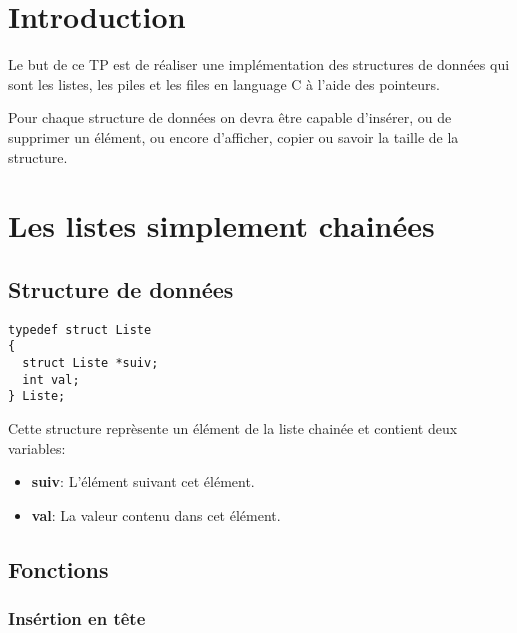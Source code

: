 \documentclass[a4paper]{article}
\begin{document}
\tableofcontents

\section{Introduction}
Le but de ce TP est de réaliser une implémentation des structures de données qui
sont les listes, les piles et les files en language C à l'aide des pointeurs.

Pour chaque structure de données on devra être capable d'insérer, ou de supprimer
un élément, ou encore d'afficher, copier ou savoir la taille de la structure.

\section{Les listes simplement chainées}

\subsection{Structure de données}

\begin{lstlisting}
typedef struct Liste 
{
  struct Liste *suiv;
  int val;
} Liste;
\end{lstlisting}

Cette structure reprèsente un élément de la liste chainée et contient deux variables: 

\begin{itemize}
  \item \textbf{suiv}: L'élément suivant cet élément.

  \item \textbf{val}: La valeur contenu dans cet élément.
\end{itemize}

\subsection{Fonctions}
\subsubsection{Insértion en tête}
\end{document}

